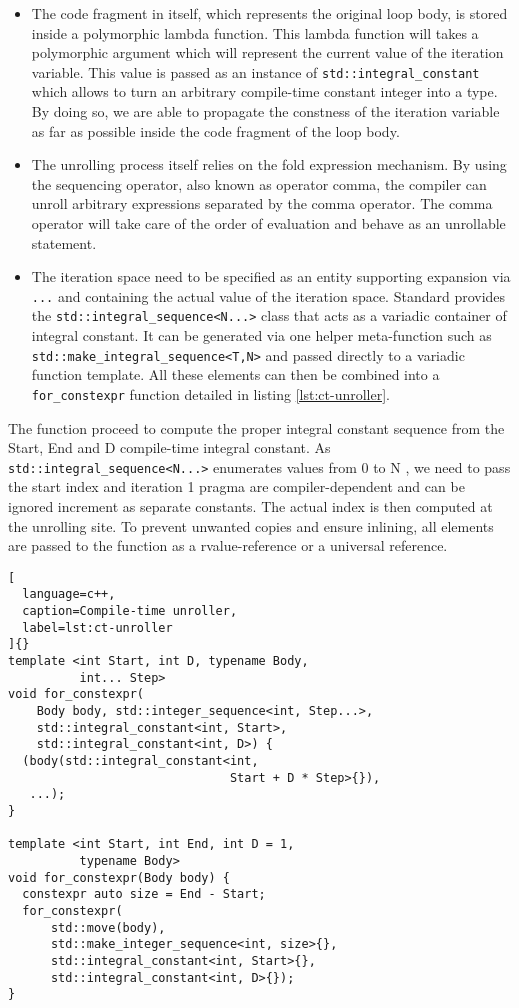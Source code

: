 \documentclass[../main]{subfiles}
\begin{document}
\begin{itemize}
\item
The code fragment in itself, which represents
the original loop body, is stored inside a
polymorphic lambda function. This lambda
function will takes a polymorphic argument which
will represent the current value of the iteration
variable. This value is passed as an instance of
\lstinline{std::integral_constant} which allows to
turn an arbitrary compile-time constant integer into
a type. By doing so, we are able to propagate the
constness of the iteration variable as far as possible
inside the code fragment of the loop body.

\item
The unrolling process itself relies on the fold
expression mechanism. By using the sequencing
operator, also known as operator comma, the
compiler can unroll arbitrary expressions separated
by the comma operator. The comma operator will
take care of the order of evaluation and behave as
an unrollable statement.

\item
The iteration space need to be specified
as an entity supporting expansion via \lstinline{...}
and containing the actual value of the
iteration space. Standard \cpp provides the
\lstinline{std::integral_sequence<N...>} class that
acts as a variadic container of integral constant. It
can be generated via one helper meta-function such
as \lstinline{std::make_integral_sequence<T,N>}
and passed directly to a variadic function template.
All these elements can then be combined into a
\lstinline{for_constexpr} function detailed in
listing \ref{lst:ct-unroller}.
\end{itemize}

The function proceed to compute the proper
integral constant sequence from the Start,
End and D compile-time integral constant. As
\lstinline{std::integral_sequence<N...>} enumerates values
from 0 to N , we need to pass the start index and iteration
1 pragma are compiler-dependent and can be ignored
increment as separate constants. The actual index is then
computed at the unrolling site. To prevent unwanted copies
and ensure inlining, all elements are passed to the function
as a rvalue-reference or a universal reference.

\begin{lstlisting}[
  language=c++,
  caption=Compile-time unroller,
  label=lst:ct-unroller
]{}
template <int Start, int D, typename Body,
          int... Step>
void for_constexpr(
    Body body, std::integer_sequence<int, Step...>,
    std::integral_constant<int, Start>,
    std::integral_constant<int, D>) {
  (body(std::integral_constant<int,
                               Start + D * Step>{}),
   ...);
}

template <int Start, int End, int D = 1,
          typename Body>
void for_constexpr(Body body) {
  constexpr auto size = End - Start;
  for_constexpr(
      std::move(body),
      std::make_integer_sequence<int, size>{},
      std::integral_constant<int, Start>{},
      std::integral_constant<int, D>{});
}
\end{lstlisting}
\end{document}
